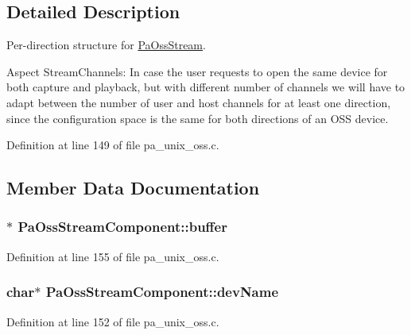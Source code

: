 \subsection{Detailed Description}
Per-\/direction structure for \hyperlink{struct_pa_oss_stream}{Pa\+Oss\+Stream}.

Aspect Stream\+Channels\+: In case the user requests to open the same device for both capture and playback, but with different number of channels we will have to adapt between the number of user and host channels for at least one direction, since the configuration space is the same for both directions of an O\+SS device. 

Definition at line 149 of file pa\+\_\+unix\+\_\+oss.\+c.



\subsection{Member Data Documentation}
\subsubsection[{\texorpdfstring{buffer}{buffer}}]{$\ast$ Pa\+Oss\+Stream\+Component\+::buffer}\hypertarget{struct_pa_oss_stream_component_a5fc847bff7f7e76d02c5427f2d1cace9}{}\label{struct_pa_oss_stream_component_a5fc847bff7f7e76d02c5427f2d1cace9}


Definition at line 155 of file pa\+\_\+unix\+\_\+oss.\+c.

\subsubsection[{\texorpdfstring{dev\+Name}{devName}}]{ char$\ast$ Pa\+Oss\+Stream\+Component\+::dev\+Name}\hypertarget{struct_pa_oss_stream_component_a4fdcd3579fbc2db73c4db6e0f5b2a5ad}{}\label{struct_pa_oss_stream_component_a4fdcd3579fbc2db73c4db6e0f5b2a5ad}


Definition at line 152 of file pa\+\_\+unix\+\_\+oss.\+c.

